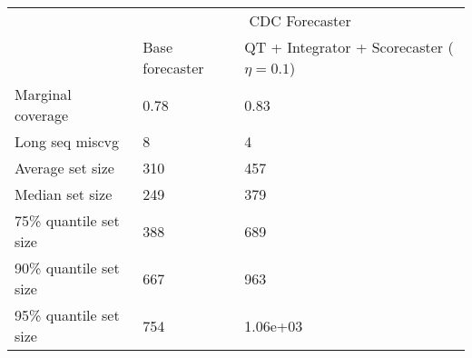\begin{tabular}{lll}
\toprule
& \multicolumn{2}{c}{CDC Forecaster} \\
& Base forecaster & QT + Integrator + Scorecaster ($\eta=0.1$) \\
\midrule
Marginal coverage & 0.78 & 0.83 \\
Long seq miscvg & 8 & 4 \\
Average set size & 310 & 457 \\
Median set size & 249 & 379 \\
75\% quantile set size & 388 & 689 \\
90\% quantile set size & 667 & 963 \\
95\% quantile set size & 754 & 1.06e+03 \\
\bottomrule
\end{tabular}
